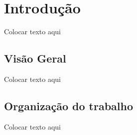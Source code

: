 \chapter[Introdução]{Introdução}
Colocar texto aqui

\section{Visão Geral}
Colocar texto aqui

\section{Organização do trabalho}
Colocar texto aqui
